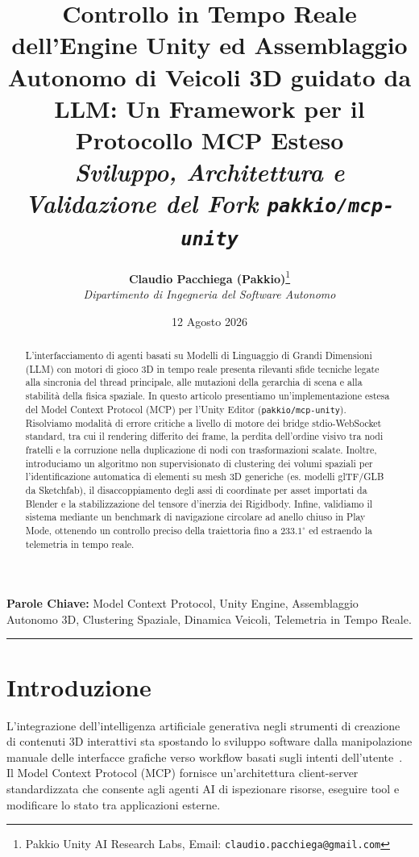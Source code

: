 \documentclass[11pt,a4paper]{article}
\title{\LARGE \textbf{Controllo in Tempo Reale dell'Engine Unity ed Assemblaggio Autonomo di Veicoli 3D guidato da LLM: Un Framework per il Protocollo MCP Esteso}\\[0.5em]
\large \textit{Sviluppo, Architettura e Validazione del Fork \texttt{pakkio/mcp-unity}}}
\author{
  \textbf{Claudio Pacchiega (Pakkio)}\thanks{Pakkio Unity AI Research Labs, Email: \texttt{claudio.pacchiega@gmail.com}}\\
  \textit{Dipartimento di Ingegneria del Software Autonomo}
}
\date{12 Agosto 2026}
\begin{document}
\maketitle

\begin{abstract}
L'interfacciamento di agenti basati su Modelli di Linguaggio di Grandi Dimensioni (LLM) con motori di gioco 3D in tempo reale presenta rilevanti sfide tecniche legate alla sincronia del thread principale, alle mutazioni della gerarchia di scena e alla stabilità della fisica spaziale. In questo articolo presentiamo un'implementazione estesa del Model Context Protocol (MCP) per l'Unity Editor (\texttt{pakkio/mcp-unity}). Risolviamo modalità di errore critiche a livello di motore dei bridge stdio-WebSocket standard, tra cui il rendering differito dei frame, la perdita dell'ordine visivo tra nodi fratelli e la corruzione nella duplicazione di nodi con trasformazioni scalate. Inoltre, introduciamo un algoritmo non supervisionato di clustering dei volumi spaziali per l'identificazione automatica di elementi su mesh 3D generiche (es. modelli glTF/GLB da Sketchfab), il disaccoppiamento degli assi di coordinate per asset importati da Blender e la stabilizzazione del tensore d'inerzia dei Rigidbody. Infine, validiamo il sistema mediante un benchmark di navigazione circolare ad anello chiuso in Play Mode, ottenendo un controllo preciso della traiettoria fino a $233.1^\circ$ ed estraendo la telemetria in tempo reale.
\end{abstract}

\textbf{\small Parole Chiave:} Model Context Protocol, Unity Engine, Assemblaggio Autonomo 3D, Clustering Spaziale, Dinamica Veicoli, Telemetria in Tempo Reale.

\hrule
\vspace{1em}

\section{Introduzione}
L'integrazione dell'intelligenza artificiale generativa negli strumenti di creazione di contenuti 3D interattivi sta spostando lo sviluppo software dalla manipolazione manuale delle interfacce grafiche verso workflow basati sugli intenti dell'utente~\cite{anthropic2024mcp}. Il Model Context Protocol (MCP) fornisce un'architettura client-server standardizzata che consente agli agenti AI di ispezionare risorse, eseguire tool e modificare lo stato tra applicazioni esterne.
\end{document}
